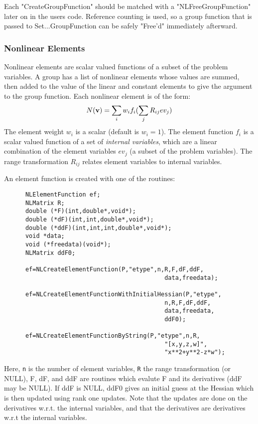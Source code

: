 \documentclass[12pt]{article}
\begin{document}
      Each "CreateGroupFunction" should be matched with a "NLFreeGroupFunction" later on in the users code. Reference
      counting is used, so a group function that is passed to Set...GroupFunction can be safely "Free'd" immediately 
      afterward.

   \subsubsection{Nonlinear Elements}

      Nonlinear elements are scalar valued functions of a subset of the problem variables. A group has a list of nonlinear
      elements whose values are summed, then added to the value of the linear and constant elements to give the argument
      to the group function. Each nonlinear element is of the form:
     \begin{displaymath}
          N({\bf v}) = \sum_i w_i f_i( \sum_j R_{ij} ev_j )
     \end{displaymath}
     The element weight $w_i$ is a scalar (default is $w_i=1$). The element function $f_i$ is a scalar valued function
     of a set of {\it internal variables}, which are a linear combination of the element variables $ev_j$ (a subset of
     the problem variables). The range transformation $R_{ij}$ relates element variables to internal variables.

     An element function is created with one of the routines:
     \begin{verbatim}
      NLElementFunction ef;
      NLMatrix R;
      double (*F)(int,double*,void*);
      double (*dF)(int,int,double*,void*);
      double (*ddF)(int,int,int,double*,void*);
      void *data;
      void (*freedata)(void*);
      NLMatrix ddF0;

      ef=NLCreateElementFunction(P,"etype",n,R,F,dF,ddF,
                                             data,freedata);

      ef=NLCreateElementFunctionWithInitialHessian(P,"etype",
                                             n,R,F,dF,ddF,
                                             data,freedata,
                                             ddF0);

      ef=NLCreateElementFunctionByString(P,"etype",n,R,
                                             "[x,y,z,w]",
                                             "x**2+y**2-z*w");
     \end{verbatim}
     Here, {\tt n} is the number of element variables, {\tt R} the range transformation (or NULL), F, dF, and ddF
     are routines which evalute F and its derivatives (ddF may be NULL). If ddF is NULL, ddF0 gives an initial
     guess at the Hessian which is then updated using rank one updates. Note that the updates are done on the
     derivatives w.r.t. the internal variables, and that the derivatives are derivatives w.r.t the internal variables.
\end{document}
